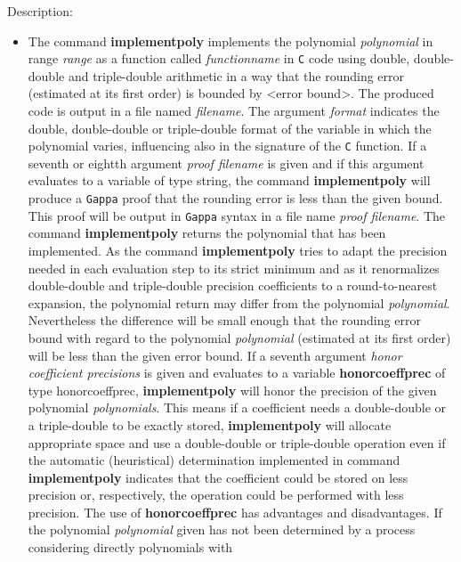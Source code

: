 \noindent Description: \begin{itemize}

\item The command \textbf{implementpoly} implements the polynomial \emph{polynomial} in range
   \emph{range} as a function called \emph{functionname} in \texttt{C} code
   using double, double-double and triple-double arithmetic in a way that
   the rounding error (estimated at its first order) is bounded by <error
   bound>. The produced code is output in a file named \emph{filename}. The
   argument \emph{format} indicates the double, double-double or triple-double
   format of the variable in which the polynomial varies, influencing
   also in the signature of the \texttt{C} function.
   If a seventh or eightth argument \emph{proof filename} is given and if this
   argument evaluates to a variable of type \textsf{string}, the command
   \textbf{implementpoly} will produce a \texttt{Gappa} proof that the
   rounding error is less than the given bound. This proof will be output
   in \texttt{Gappa} syntax in a file name \emph{proof filename}.
   The command \textbf{implementpoly} returns the polynomial that has been
   implemented. As the command \textbf{implementpoly} tries to adapt the precision
   needed in each evaluation step to its strict minimum and as it
   renormalizes double-double and triple-double precision coefficients to
   a round-to-nearest expansion, the polynomial return may differ from
   the polynomial \emph{polynomial}. Nevertheless the difference will be small
   enough that the rounding error bound with regard to the polynomial
   \emph{polynomial} (estimated at its first order) will be less than the
   given error bound.
   If a seventh argument \emph{honor coefficient precisions} is given and
   evaluates to a variable \textbf{honorcoeffprec} of type \textsf{honorcoeffprec},
   \textbf{implementpoly} will honor the precision of the given polynomial
   \emph{polynomials}. This means if a coefficient needs a double-double or a
   triple-double to be exactly stored, \textbf{implementpoly} will allocate appropriate
   space and use a double-double or triple-double operation even if the
   automatic (heuristical) determination implemented in command \textbf{implementpoly}
   indicates that the coefficient could be stored on less precision or,
   respectively, the operation could be performed with less
   precision. The use of \textbf{honorcoeffprec} has advantages and
   disadvantages. If the polynomial \emph{polynomial} given has not been
   determined by a process considering directly polynomials with

\end{itemize}
